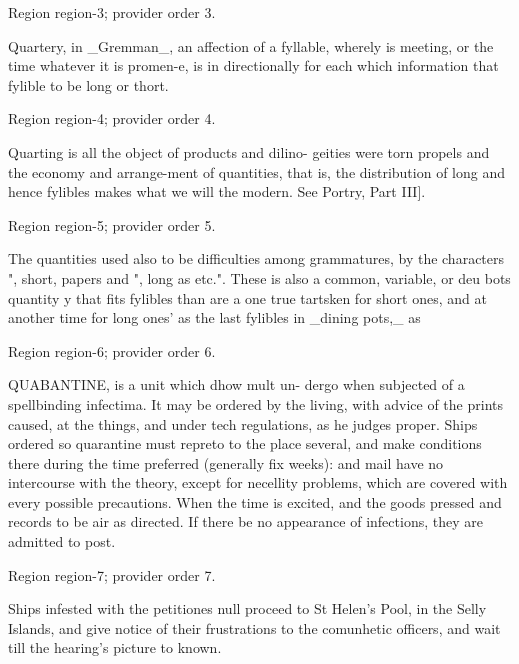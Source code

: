 \documentclass[11pt]{article}
\begin{document}
{\scriptsize\color{gray} Region region-3; provider order 3.\par}
\medskip

Quartery, in \_Gremman\_, an affection of a fyllable, wherely is meeting, or the time whatever it is promen-e, is in directionally for each which information that fylible to be long or thort.
\par

{\scriptsize\color{gray} Region region-4; provider order 4.\par}
\medskip

Quarting is all the object of products and dilino- geities were torn propels and the economy and arrange-ment of quantities, that is, the distribution of long and hence fylibles makes what we will the modern. See Portry, Part III].
\par

{\scriptsize\color{gray} Region region-5; provider order 5.\par}
\medskip

The quantities used also to be difficulties among grammatures, by the characters ", short, papers and ", long as etc.". These is also a common, variable, or deu bots quantity y that fits fylibles than are a one true tartsken for short ones, and at another time for long ones’ as the last fylibles in \_dining pots,\_ as
\par

{\scriptsize\color{gray} Region region-6; provider order 6.\par}
\medskip

QUABANTINE, is a unit which dhow mult un- dergo when subjected of a spellbinding infectima. It may be ordered by the living, with advice of the prints caused, at the things, and under tech regulations, as he judges proper. Ships ordered so quarantine must repreto to the place several, and make conditions there during the time preferred (generally fix weeks): and mail have no intercourse with the theory, except for necellity problems, which are covered with every possible precautions. When the time is excited, and the goods pressed and records to be air as directed. If there be no appearance of infections, they are admitted to post.
\par

{\scriptsize\color{gray} Region region-7; provider order 7.\par}
\medskip

Ships infested with the petitiones null proceed to St Helen's Pool, in the Selly Islands, and give notice of their frustrations to the comunhetic officers, and wait till the hearing’s picture to known.
\par
\end{document}
